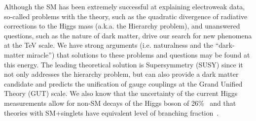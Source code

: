 
Although the SM has been extremely successful at explaining electroweak data, so-called problems with the theory, such as the quadratic divergence of radiative corrections to the Higgs mass (a.k.a. the Hierarchy problem), and unanswered questions, such as the nature of dark matter, drive our search for new phenomena at the TeV scale. We have strong arguments (i.e. naturalness and the ``dark-matter miracle'') 
that solutions to these problems and questions may be found at this energy. 
The leading theoretical solution is Supersymmetry (SUSY) since it not only addresses the hierarchy problem, but can also provide a dark matter candidate and predicts the unification of gauge couplings at the Grand Unified Theory (GUT) scale.
We also know that the uncertainty of the current Higgs measurements allow for non-SM decays of the Higgs boson of 26\%~\cite{combin} and that theories with SM+singlets have equivalent level of branching fraction~\cite{exohiggs}.




